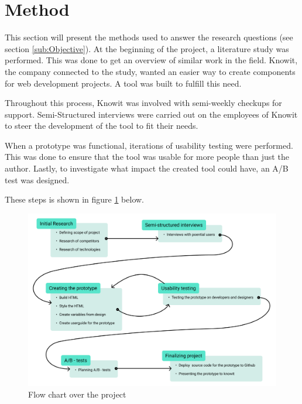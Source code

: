 \section{Method}

This section will present the methods used to answer the research questions (see section \ref{sub:Objective}).  At the beginning of the project, a literature study was performed. This was done to get an overview of similar work in the field. Knowit, the company connected to the study, wanted an easier way to create components for web development projects. A tool was built to fulfill this need. 


Throughout this process, Knowit was involved with semi-weekly checkups for support. Semi-Structured interviews were carried out on the employees of Knowit to steer the development of the tool to fit their needs. 

When a prototype was functional, iterations of usability testing were performed. This was done to ensure that the tool was usable for more people than just the author. Lastly, to investigate what impact the created tool could have, an A/B test was designed.

These steps is shown in figure \ref{fig:projectFlowChart} below.


\begin{figure}[H]
  \includegraphics[width=\linewidth]{../images/Project flow chart.png}
  \caption{Flow chart over the project}
  \label{fig:projectFlowChart}
\end{figure}



